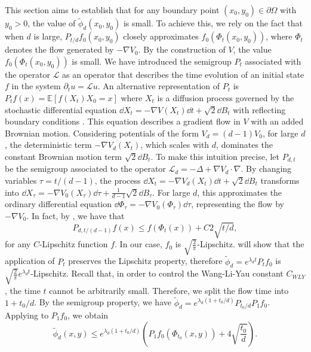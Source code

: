 This section aims to establish that for any boundary point $(x_0, y_0) \in \partial \Omega$ with $y_0 > 0$, the value of $\tilde \phi_d(x_0,y_0)$ is small. To achieve this, we rely on the fact that when $d$ is large, $P_{t/d} f_0(x_0, y_0)$ closely approximates $f_0(\Phi_t(x_0, y_0))$, where $\Phi_t$ denotes the flow generated by $-\nabla V_0$. By the construction of $V$, the value $f_0(\Phi_t(x_0, y_0))$ is small. We have introduced the semigroup \( P_t \) associated with the operator \( \mathcal{L} \) as an operator that describes the time evolution of an initial state $f$ in the system $\partial_t u = \mathcal{L} u$. An alternative representation of \( P_t \) is $P_t f(x) = \mathbb{E}[f(X_t)  X_0 = x]$ where $X_t$ is a diffusion process governed by the stochastic differential equation $\dd{X}_t = -\nabla V(X_t) \dd{t} + \sqrt{2} \dd{B}_t$ with reflecting boundary conditions \cite{chen_lecture_2025}. This equation describes a gradient flow in $V$ with an added Brownian motion. Considering potentials of the form $V_d = (d-1) V_0$, for large $d$, the deterministic term $-\nabla V_d(X_t)$, which scales with $d$, dominates the constant Brownian motion term $\sqrt{2}\dd{B}_t$. To make this intuition precise, let $P_{d,t}$ be the semigroup associated to the operator $\mathcal{L}_d = -\Delta + \nabla V_d \cdot \nabla$. By changing variables $\tau = t/(d-1)$, the process $\dd{X}_t = -\nabla V_d(X_t) \dd{t} + \sqrt{2} \dd{B}_t$ transforms into $\dd{X}_\tau = -\nabla V_0(X_\tau) \dd{\tau} + \frac{1}{d-1}\sqrt{2} \dd{B}_\tau$. For large $d$, this approximates the ordinary differential equation $\dd{\Phi}_\tau = -\nabla V_0(\Phi_\tau) \dd{\tau}$, representing the flow by $-\nabla V_0$. In fact, by , we have that
\begin{equation*}
    P_{d, t/(d-1)} f (x) \le f(\Phi_t(x)) + C 2\sqrt{t/d},
\end{equation*}
for any $C$-Lipschitz function $f$. In our case, $f_0$ is $\sqrt{\frac{2}{\pi}}$-Lipschitz.  will show that the application of $P_t$ preserves the Lipschitz property, therefore $\tilde \phi_d = e^{\lambda_d t} P_t f_0$ is $\sqrt{\frac{2}{\pi}}e^{\lambda_d t}$-Lipschitz. Recall that, in order to control the Wang-Li-Yau constant $C_{WLY}$, the time $t$ cannot be arbitrarily small. Therefore, we split the flow time into $1+t_0/d$. By the semigroup property, we have $\tilde \phi_d = e^{\lambda_d (1+t_0/d)}P_{t_0/d}P_1 f_0$. Applying  to $P_1 f_0$, we obtain
\begin{equation*}
    \tilde \phi_d (x, y) \le e^{\lambda_d (1+t_0/d)} \left(P_1 f_0(\Phi_{t_0}(x, y)) + 4\sqrt{\frac{t_0}{d}}\right).
\end{equation*}

